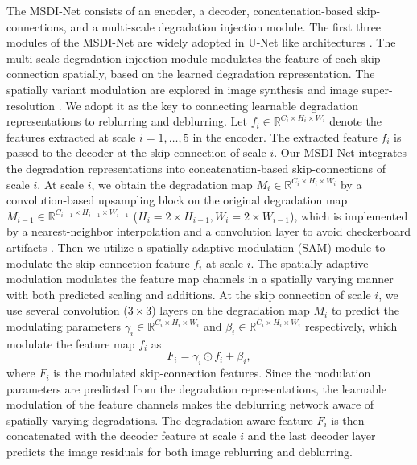 \documentclass[runningheads]{llncs}
\begin{document}
The MSDI-Net consists of an encoder, a decoder, concatenation-based skip-connections, and a multi-scale degradation injection module. 
The first three modules of the MSDI-Net are widely adopted in U-Net like architectures \cite{U-Net}. The multi-scale degradation injection module modulates the feature of each skip-connection spatially, based on the learned degradation representation. The spatially variant modulation are explored in image synthesis \cite{park2019SPADE} and image super-resolution \cite{liang2021mutual}. We adopt it as the key to connecting learnable degradation representations to reblurring and deblurring. 
Let $f_i \in \mathbb{R}^{C_i \times H_i \times W_i}$ denote the features extracted at scale $i = 1, \dots, 5$ in the encoder. 
The extracted feature $f_i$ is passed to the decoder at the skip connection of scale $i$. 
Our MSDI-Net integrates the degradation representations into concatenation-based skip-connections of scale $i$. 
At scale $i$, we obtain the degradation map $M_i \in \mathbb{R}^{C_i \times H_i \times W_i}$ by a convolution-based upsampling block on the original degradation map $M_{i-1} \in \mathbb{R}^{C_{i-1} \times H_{i-1} \times W_{i-1}}$ ($H_{i} = 2 \times H_{i-1},W_{i} = 2 \times W_{i-1}$), which is implemented by a nearest-neighbor interpolation and a convolution layer to avoid checkerboard artifacts \cite{checkboardartifacts}. 
Then we utilize a spatially adaptive modulation (SAM) module to modulate the skip-connection feature $f_i$ at scale $i$. The spatially adaptive modulation modulates the feature map channels in a spatially varying manner with both predicted scaling and additions.
At the skip connection of scale $i$, we use several convolution ($3\times3$) layers on the degradation map $M_i$ to predict the modulating parameters $\gamma_i \in \mathbb{R}^{C_i \times H_i \times W_i}$ and $\beta_i \in \mathbb{R}^{C_i \times H_i \times W_i}$ respectively, which modulate the feature map $f_i$ as
\begin{equation}
    F_i = \gamma_i \odot f_i  + \beta_i,
\end{equation}
where $F_i$ is the modulated skip-connection features. Since the modulation parameters are predicted from the degradation representations, the learnable modulation of the feature channels makes the deblurring network aware of spatially varying degradations.
The degradation-aware feature $F_i$ is then concatenated with the decoder feature at scale $i$ and the last decoder layer predicts the image residuals for both image reblurring and deblurring.
\end{document}
